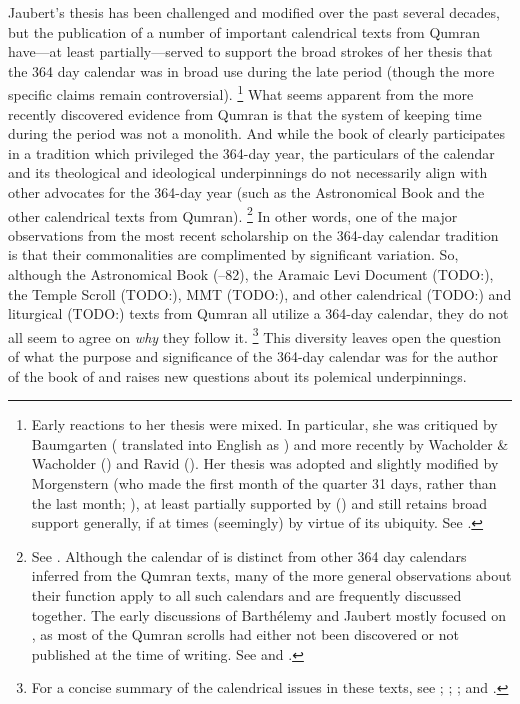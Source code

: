 Jaubert's thesis has been challenged and modified over the past several decades, but the publication of a number of important calendrical texts from Qumran have---at least partially---served to support the broad strokes of her thesis that the 364 day calendar was in broad use during the late \secondtemple period (though the more specific claims remain controversial).%
    \footnote{Early reactions to her thesis were mixed. In particular, she was critiqued by Baumgarten (\cite*{baumgarten_tarbiz1962} translated into English as \cite*{baumgarten_baumgarten1977}) and more recently by Wacholder \& Wacholder (\cite*{wacholder-wacholder_huca1995}) and Ravid (\cite*{ravid_dsd2003}). Her thesis was adopted and slightly modified by Morgenstern (who made the first month of the quarter 31 days, rather than the last month; \cite*{morgenstern_vt1955}), at least partially supported by \vanderkam (\cite*[410--411]{vanderkam_cbq1979}) and still retains broad support generally, if at times (seemingly) by virtue of its ubiquity. See \cite[142]{bendov-saulnier_cbr2008}.}
What seems apparent from the more recently discovered evidence from Qumran is that the system of keeping time during the \secondtemple period was not a monolith. And while the book of \jub clearly participates in a tradition which privileged the 364-day year, the particulars of the \jub calendar and its theological and ideological underpinnings do not necessarily align with other advocates for the 364-day year (such as the Astronomical Book and the other calendrical texts from Qumran).%
    \footnote{See \cite[,159]{bendov-saulnier_cbr2008}. Although the calendar of \jub is distinct from other 364 day calendars inferred from the Qumran texts, many of the more general observations about their function apply to all such calendars and are frequently discussed together. The early discussions of Barthélemy and Jaubert mostly focused on \jub, as most of the Qumran scrolls had either not been discovered or not published at the time of writing. See \cite{barthelemy_rb1952} and \cite{jaubert_vt1957}.}
In other words, one of the major observations from the most recent scholarship on the 364-day calendar tradition is that their commonalities are complimented by significant variation. So, although the Astronomical Book (--82), the Aramaic Levi Document (TODO:), the Temple Scroll (TODO:), MMT (TODO:), and other calendrical (TODO:) and liturgical (TODO:) texts from Qumran all utilize a 364-day calendar, they do not all seem to agree on \emph{why} they follow it.%
    \footnote{For a concise summary of the calendrical issues in these texts, see \cite{vanderkam1998}; \cite[233--268]{glessmer_flint-vanderkam1999}; \cite[127--135]{bendov-saulnier_cbr2008}; and \cite{jacobus_brooke-hempel2018}.}
This diversity leaves open the question of what the purpose and significance of the 364-day calendar was for the author of the book of \jub and raises new questions about its polemical underpinnings.




